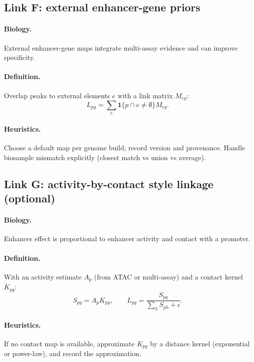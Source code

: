 \documentclass[11pt]{article}
\begin{document}
\subsection{Link F: external enhancer-gene priors}
\paragraph{Biology.} External enhancer-gene maps integrate multi-assay evidence and can improve specificity.
\paragraph{Definition.} Overlap peaks to external elements $e$ with a link matrix $M_{eg}$:
\[
L_{pg} = \sum_e \mathbf{1}\{p \cap e \neq \emptyset\} M_{eg}.
\]
\paragraph{Heuristics.} Choose a default map per genome build; record version and provenance. Handle biosample mismatch explicitly (closest match vs union vs average).

\subsection{Link G: activity-by-contact style linkage (optional)}
\paragraph{Biology.} Enhancer effect is proportional to enhancer activity and contact with a promoter.
\paragraph{Definition.} With an activity estimate $A_p$ (from ATAC or multi-assay) and a contact kernel $K_{pg}$:
\[
S_{pg} = A_p K_{pg}, \qquad L_{pg} = \frac{S_{pg}}{\sum_h S_{ph}+\epsilon}.
\]
\paragraph{Heuristics.} If no contact map is available, approximate $K_{pg}$ by a distance kernel (exponential or power-law), and record the approximation.
\end{document}
